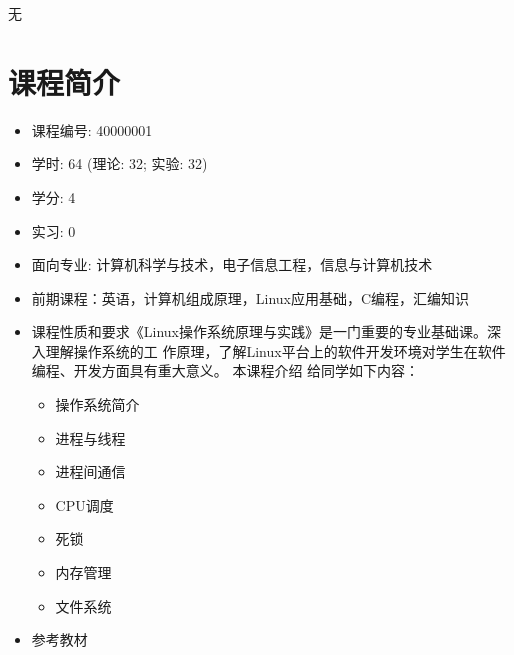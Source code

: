 \documentclass{wx672ctexart}
\begin{document}
无

\section{课程简介}
\label{sec-4}

\begin{itemize}
\item 课程编号: 40000001
\item 学时: 64 (理论: 32; 实验: 32)
\item 学分: 4
\item 实习: 0
\item 面向专业: 计算机科学与技术，电子信息工程，信息与计算机技术
\item 前期课程：英语，计算机组成原理，Linux应用基础，C编程，汇编知识
\item 课程性质和要求《Linux操作系统原理与实践》是一门重要的专业基础课。深入理解操作系统的工
  作原理，了解Linux平台上的软件开发环境对学生在软件编程、开发方面具有重大意义。 本课程介绍
  给同学如下内容：
  \begin{itemize}
  \item 操作系统简介
  \item 进程与线程
  \item 进程间通信
  \item CPU调度
  \item 死锁
  \item 内存管理
  \item 文件系统
  \end{itemize}
\item 参考教材\hfill
  \nocite{silberschatz11essentials,tanenbaum2008modern,bovet2005understanding}
  \printbibliography[heading=none]{}
\end{itemize}
\end{document}
